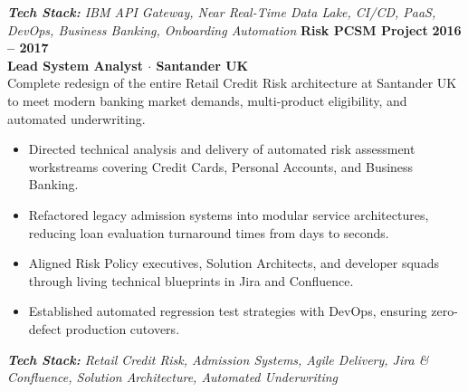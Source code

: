 \documentclass[10pt,a4paper]{article}
\begin{document}
\noindent\textit{\footnotesize \textbf{Tech Stack:} IBM API Gateway, Near Real-Time Data Lake, CI/CD, PaaS, DevOps, Business Banking, Onboarding Automation}
\vspace{10pt}
\noindent\textbf{\large Risk PCSM Project} \hfill {\color{SynthBlue}\textbf{2016 -- 2017}} \\
{\color{SynthPink}\textbf{Lead System Analyst $\cdot$ Santander UK}} \\
\vspace{2pt}
Complete redesign of the entire Retail Credit Risk architecture at Santander UK to meet modern banking market demands, multi-product eligibility, and automated underwriting.
\begin{itemize}[leftmargin=1.5em, itemsep=1.5pt, topsep=2pt]
    \item Directed technical analysis and delivery of automated risk assessment workstreams covering Credit Cards, Personal Accounts, and Business Banking.
    \item Refactored legacy admission systems into modular service architectures, reducing loan evaluation turnaround times from days to seconds.
    \item Aligned Risk Policy executives, Solution Architects, and developer squads through living technical blueprints in Jira and Confluence.
    \item Established automated regression test strategies with DevOps, ensuring zero-defect production cutovers.
\end{itemize}
\noindent\textit{\footnotesize \textbf{Tech Stack:} Retail Credit Risk, Admission Systems, Agile Delivery, Jira \& Confluence, Solution Architecture, Automated Underwriting}
\vspace{10pt}


\end{document}
